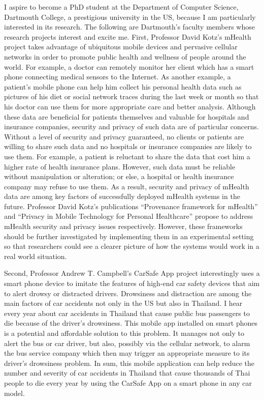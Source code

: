 \documentclass[a4paper,10pt]{report}
\newcommand{\university}{Dartmouth College}
\newcommand{\department}{Department of Computer Science}
\newcommand{\uniabbre}{Dartmouth}
\begin{document}
\vspace{0.2cm}
I aspire to become a PhD student at the \department, \university, a prestigious university in the US, because I am particularly interested in its research. The following are \uniabbre's faculty members whose research projects interest and excite me. First, Professor David Kotz's mHealth project takes advantage of ubiquitous mobile devices and pervasive cellular networks in order to promote public health and wellness of people around the world. For example, a doctor can remotely monitor her client which has a smart phone connecting medical sensors to the Internet. As another example, a patient's mobile phone can help him collect his personal health data such as pictures of his diet or social network traces during the last week or month so that his doctor can use them for more appropriate care and better analysis. Although these data are beneficial for patients themselves and valuable for hospitals and insurance companies, security and privacy of such data are of particular concerns. Without a level of security and privacy guaranteed, no clients or patients are willing to share such data and no hospitals or insurance companies are likely to use them. For example, a patient is reluctant to share the data that cost him a higher rate of health insurance plans. However, such data must be reliable without manipulation or alteration; or else, a hospital or health insurance company may refuse to use them. As a result, security and privacy of mHealth data are among key factors of successfully deployed mHealth systems in the future. Professor David Kotz's publications ``Provenance framework for mHealth'' and ``Privacy in Mobile Technology for Personal Healthcare'' propose to address mHealth security and privacy issues respectively. However, these frameworks should be further investigated by implementing them in an experimental setting so that researchers could see a clearer picture of how the systems would work in a real world situation.

\vspace{0.2cm}
Second, Professor Andrew T. Campbell's CarSafe App project interestingly uses a smart phone device to imitate the features of high-end car safety devices that aim to alert drowsy or distracted drivers. Drowsiness and distraction are among the main factors of car accidents not only in the US but also in Thailand. I hear every year about car accidents in Thailand that cause public bus passengers to die because of the driver's drowsiness. This mobile app installed on  smart phones is a potential and affordable solution to this problem. It manages not only to alert the bus or car driver, but also, possibly via the cellular network, to alarm the bus service company which then may trigger an appropriate measure to its driver's drowsiness problem. In sum, this mobile application can help reduce the number and severity of car accidents in Thailand that cause thousands of Thai people to die every year by using the CarSafe App on a smart phone in any car model. 
\end{document}
